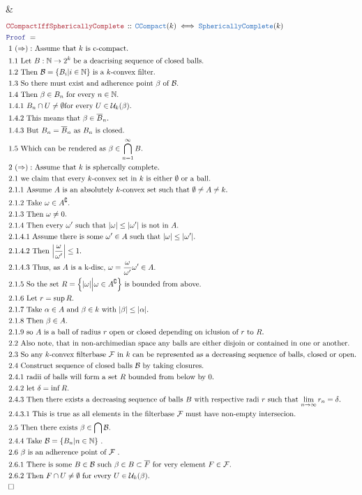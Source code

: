 \documentclass[12pt]{scrartcl}
\newcommand{\TYPE}[1]{\textcolor{NavyBlue}{\mathtt{#1}}}
\newcommand{\LOGIC}[1]{\textcolor{Blue}{\mathtt{#1}}}
\newcommand{\THM}[1]{\textcolor{Maroon}{\mathtt{#1}}}
\renewcommand{\.}{\; . \;}
\newcommand{\Theorem}[2]{& \THM{#1} \, :: \, #2 \\ & \Proof = \\ }
\newcommand{\Page}[1]{ \begin{align*} #1 \end{align*}   }
\newcommand{\Explain}[1]{& \text{#1.} \\}
\newcommand{\Nat}{\mathbb{N} }
\renewcommand{\c}{\complement}
\newcommand{\QED}{\; \square}
\newcommand{\EndProof}{& \QED \\}
\newcommand{\Proof}{\LOGIC{Proof} \; }
\newcommand{\B}{\mathcal{B}}
\renewcommand{\U}{\mathcal{U}}
\newcommand{\F}{\mathcal{F}}
\newcommand{\CCompact}{\TYPE{CCompact}}
\begin{document}
{	\EndProof
}\Page{
	\Theorem{CCompactIffSphericallyComplete}
	{
		\CCompact(k) \iff \TYPE{SphericallyComplete}(k)
	}
	\Explain{ 1 $(\Rightarrow):$ Assume that $k$ is c-compact}
	\Explain{ 1.1 Let $B:\Nat \to 2^k$ be a deacrising sequence of closed balls}
	\Explain{ 1.2 Then $\B =\{B_i | i \in \Nat\}$ is a $k$-convex filter}
	\Explain{ 1.3 So there must exist and adherence point $\beta$ of $\B$}
	\Explain{ 1.4 Then $\beta \in B_n$ for every $n \in \Nat$}
	\Explain{ 1.4.1 $B_n \cap U \neq \emptyset$for every $U \in \U_k(\beta)$}
	\Explain{ 1.4.2 This means that $\beta \in \overline{B}_n$}
	\Explain{ 1.4.3 But $B_n = \overline{B}_n$ as $B_n$ is closed}
	\Explain{ 1.5 Which can be rendered as $\beta \in \bigcap^\infty_{n=1} B$}
	\Explain{ 2  $(\Rightarrow):$ Assume that $k$ is sphercally complete}
	\Explain{ 2.1  we claim that every $k$-convex set in $k$ is either 
		$\emptyset$ or a ball}
	\Explain{ 2.1.1 Assume $A$ is an absolutely $k$-convex set such that 
		$\emptyset \neq A \neq k$}
	\Explain{ 2.1.2 Take $\omega \in A^\c$}
	\Explain{ 2.1.3 Then $\omega \neq 0$}
	\Explain{ 2.1.4 Then every $\omega'$ such that $|\omega| \le |\omega'|$ is not in $A$} 
	\Explain{ 2.1.4.1 Assume there is some $\omega' \in A$ such that $|\omega| \le |\omega'|$}
	\Explain{ 2.1.4.2 Then $\left| \frac{\omega}{\omega'}\right| \le 1$}	
	\Explain{ 2.1.4.3 Thus, as $A$ is a k-disc, $\omega = \frac{\omega}{\omega'}\omega' \in A$}
	\Explain{ 2.1.5 So the set $R = \Big\{ |\omega| \Big| \omega \in A^\c\Big\}$
		is bounded from above} 
	\Explain{ 2.1.6 Let $r = \sup R$}
	\Explain{ 2.1.7 Take $\alpha \in A$ and $\beta \in k$ with $|\beta| \le |\alpha|$}
	\Explain{ 2.1.8 Then $\beta \in A$}
	\Explain{ 2.1.9 so $A$ is a ball of radius $r$ open or closed depending on iclusion of $r$ to $R$}
	\Explain{ 2.2 Also note, 
		that in non-archimedian space any balls are either disjoin or contained in one or another}
	\Explain{
		2.3 So any $k$-convex filterbase $\F$ in $k$ can be represented as 
		a decreasing sequence of balls, closed or open}
	\Explain{
		2.4 Construct sequence of closed balls $\B$ by taking closures}
	\Explain{
		2.4.1 radii of balls will form a set $R$ bounded from below by $0$}
	\Explain{
		2.4.2 let $\delta = \inf R$}
	\Explain{
		2.4.3 Then there exists a decreasing sequence of balls $B$ with respective radi $r$
		such that $\lim_{n\to\infty} r_n = \delta$}
	\Explain{
		2.4.3.1 This is true as all elements in the filterbase $\F$ must have non-empty intersecion}
	\Explain{
		2.5 Then there exists $\beta \in \bigcap \B$}
	\Explain{
		2.4.4 Take $\B = \{ B_n | n \in \Nat\}$
	}
	\Explain{
		2.6 $\beta$ is an adherence point of $\F$
	}
	\Explain{
		2.6.1 There is some $B \in \B$ such $\beta \in B \subset \overline{F}$ for very element $F \in \F$}
	\Explain{
		2.6.2 Then $F \cap U \neq \emptyset$ for every $U \in \U_k(\beta)$}
	\EndProof
}
\newpage
\end{document}
